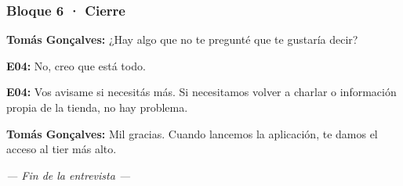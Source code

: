 \subsubsection*{Bloque 6 · Cierre}

\noindent\textbf{Tomás Gonçalves:} ¿Hay algo que no te pregunté que te gustaría decir?

\noindent\textbf{E04:} No, creo que está todo.

\noindent\textbf{E04:} Vos avisame si necesitás más. Si necesitamos volver a charlar o información propia de la tienda, no hay problema.

\noindent\textbf{Tomás Gonçalves:} Mil gracias. Cuando lancemos la aplicación, te damos el acceso al tier más alto.

\begin{center}\textit{--- Fin de la entrevista ---}\end{center}
